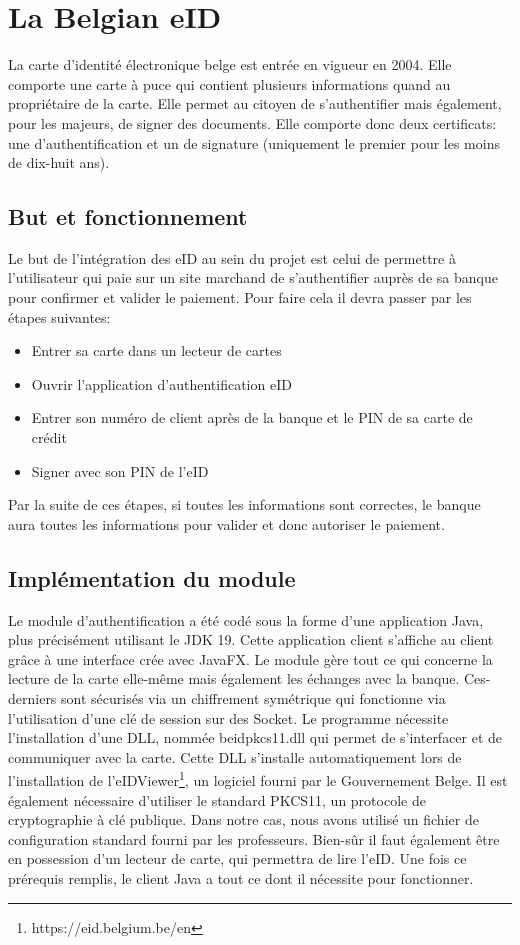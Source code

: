 \section{La Belgian eID}

La carte d'identité électronique belge est entrée en vigueur en 2004. Elle comporte une carte à puce qui contient plusieurs informations quand au propriétaire de la carte. Elle permet au citoyen de s'authentifier mais également, pour les majeurs, de signer des documents. Elle comporte donc deux certificats: une d'authentification et un de signature (uniquement le premier pour les moins de dix-huit ans).

\subsection{But et fonctionnement}

Le but de l'intégration des eID au sein du projet est celui de permettre à l'utilisateur qui paie sur un site marchand de s'authentifier auprès de sa banque pour confirmer et valider le paiement. Pour faire cela il devra passer par les étapes suivantes: 

\begin{itemize}
    \item Entrer sa carte dans un lecteur de cartes
    \item Ouvrir l'application d'authentification eID
    \item Entrer son numéro de client après de la banque et le PIN de sa carte de crédit 
    \item  Signer avec son PIN de l'eID 
\end{itemize}

Par la suite de ces étapes, si toutes les informations sont correctes, le banque aura toutes les informations pour valider et donc autoriser le paiement. 

\subsection{Implémentation du module}

Le module d'authentification a été codé sous la forme d'une application Java, plus précisément utilisant
le JDK 19. Cette application client s'affiche au client grâce à une interface crée avec JavaFX. Le module
gère tout ce qui concerne la lecture de la carte elle-même mais également les échanges avec la
banque. Ces-derniers sont sécurisés via un chiffrement symétrique qui fonctionne via l'utilisation
d'une clé de session sur des Socket.
Le programme nécessite l'installation d'une DLL, nommée beidpkcs11.dll qui permet de s'interfacer et
de communiquer avec la carte. Cette DLL s'installe automatiquement lors de l'installation de
l'eIDViewer\footnote{https://eid.belgium.be/en}, un logiciel fourni par le Gouvernement Belge. Il est également nécessaire d'utiliser le
standard PKCS11, un protocole de cryptographie à clé publique. Dans notre cas, nous avons utilisé un
fichier de configuration standard fourni par les professeurs. Bien-sûr il faut également être en
possession d'un lecteur de carte, qui permettra de lire l'eID.
Une fois ce prérequis remplis, le client Java a tout ce dont il nécessite pour fonctionner.

